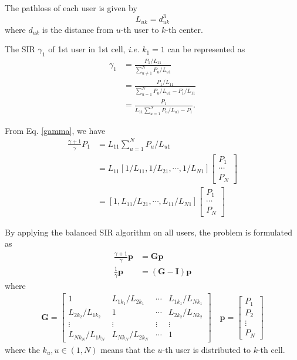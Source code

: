 \documentclass[12pt]{article}
\begin{document}
The pathloss of each user is given by
\begin{equation}
L_{uk} = d_{uk}^3
\end{equation}
where $d_{uk}$ is the distance from $u$-th user to $k$-th center.

The SIR $\gamma_1$ of 1st user in 1st cell, \textit{i.e.} $k_1=1$ can be represented as
\begin{align}\label{gamma}
	\gamma_1 &= \frac{P_1/L_{11}}{\sum_{u\neq 1}^{N}P_{u}/L_{u1}} \nonumber\\
	&= \frac{P_1/L_{11}}{\sum_{u=1}^{N}P_{u}/L_{u1} - P_1/L_{11}} \nonumber\\
	&= \frac{P_1}{L_{11}\sum_{u=1}^{N}P_{u}/L_{u1} - P_1}. 
\end{align}

From Eq. \eqref{gamma}, we have
\begin{align}
\frac{\gamma+1}{\gamma}P_1 &= L_{11}\sum_{u=1}^{N}P_{u}/L_{u1} \nonumber\\
& = L_{11} 
[1/L_{11}, 1/L_{21},\cdots, 1/L_{N1}]
\begin{bmatrix}
P_{1}\\
\cdots \\
P_{N}
\end{bmatrix}\nonumber\\
&=[1, L_{11}/L_{21},\cdots, L_{11}/L_{N1}]
\begin{bmatrix}
P_{1}\\
\cdots \\
P_{N}
\end{bmatrix}
\end{align}

By applying the balanced SIR algorithm on all users, the problem is formulated as
\begin{align}
\frac{\gamma+1}{\gamma}\bm{p} &= \bm{G}\bm{p} \nonumber\\
\frac{1}{\gamma}\bm{p} &= (\bm{G}-\bm{I})\bm{p}
\end{align}
where 
\begin{align}
\bm{G} = 
\begin{bmatrix}
1& L_{1k_1}/L_{2k_1}&\cdots& L_{1k_1}/L_{Nk_1}\\
L_{2k_2}/L_{1k_2}& 1&\cdots& L_{2k_2}/L_{Nk_2}\\
\vdots&\vdots&\vdots&\vdots\\
L_{Nk_N}/L_{1k_N}& L_{Nk_N}/L_{2k_N}&\cdots& 1
\end{bmatrix}
\quad
\bm{p} =
\begin{bmatrix}
P_{1}\\
P_{2}\\
\vdots\\
P_N
\end{bmatrix}
\end{align}
where the $k_u,u\in (1, N)$ means that the $u$-th user is distributed to $k$-th cell.
\end{document}
